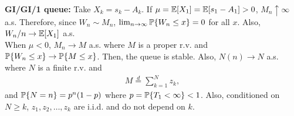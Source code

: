 \documentclass[all-lectures.tex]{subfiles}
\begin{document}
\textbf{GI/GI/1 queue:} Take $X_k = s_k - A_k$. If $\mu = \E[X_1] = \E[s_1 - A_1] >0$, $M_n \uparrow \infty$ a.s. Therefore, since $W_n \sim M_n$, $\lim_{n \to \infty} \P\{ W_n \leq x\} =0$ for all $x$. Also, $W_n/n \to \E[X_1]$ a.s. \\
\indent When $\mu<0$, $M_n \to M$ a.s. where $M$ is a proper r.v. and $\P\{W_n \leq x\} \to \P\{M \leq x\}$. Then, the queue is stable. Also, $N(n) \to N$ a.s. where $N$ is a finite r.v. and 
\begin{align*}
M \stackrel{d}{=} \sum_{k=1}^N z_k,
\end{align*}
and $\P\{N=n\} = p^n(1-p)$ where $p = \P\{T_1 <\infty\}<1$. Also, conditioned on $N\geq k$, $z_1, z_2, \dots,z_k$ are i.i.d. and do not depend on $k$.
\end{document}
